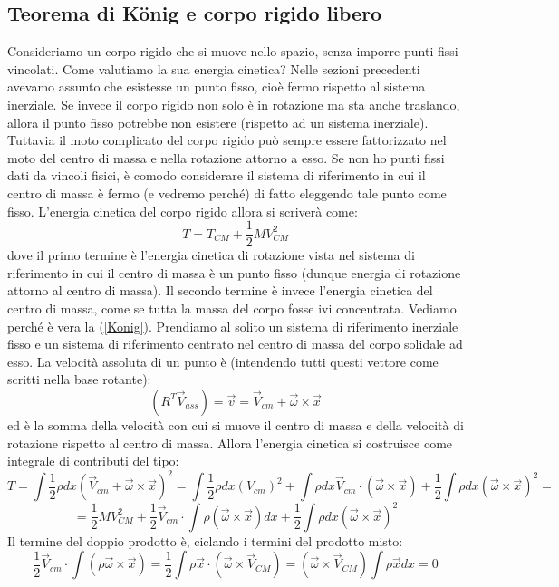 \documentclass[a4paper,openany]{article}
\begin{document}
	\subsection{Teorema di König e corpo rigido libero}
	Consideriamo un corpo rigido che si muove nello spazio, senza imporre punti fissi vincolati. Come valutiamo la sua energia cinetica? Nelle sezioni precedenti avevamo assunto che esistesse un punto fisso, cioè fermo rispetto al sistema inerziale. Se invece il corpo rigido non solo è in rotazione ma sta anche traslando, allora il punto fisso potrebbe non esistere (rispetto ad un sistema inerziale). Tuttavia il moto complicato del corpo rigido può sempre essere fattorizzato nel moto del centro di massa e nella rotazione attorno a esso. Se non ho punti fissi dati da vincoli fisici, è comodo considerare il sistema di riferimento in cui il centro di massa è fermo (e vedremo perché) di fatto eleggendo tale punto come fisso. L'energia cinetica del corpo rigido allora si scriverà come:
	\begin{equation}
		T = T_{CM} + \dfrac{1}{2}MV_{CM}^{2}
		\label{Konig}
	\end{equation}
	dove il primo termine è l'energia cinetica di rotazione vista nel sistema di riferimento in cui il centro di massa è un punto fisso (dunque energia di rotazione attorno al centro di massa). Il secondo termine è invece l'energia cinetica del centro di massa, come se tutta la massa del corpo fosse ivi concentrata. 
	Vediamo perché è vera la (\ref{Konig}). Prendiamo al solito un sistema di riferimento inerziale fisso e un sistema di riferimento centrato nel centro di massa del corpo solidale ad esso. La velocità assoluta di un punto è (intendendo tutti questi vettore come scritti nella base rotante):
	$$
	(R^{T}\vec{V}_{ass}) = \vec{v} = \vec{V}_{cm} + \vec{\omega}\times\vec{x}
	$$
	ed è la somma della velocità con cui si muove il centro di massa e della velocità di rotazione rispetto al centro di massa. Allora l'energia cinetica si costruisce come integrale di contributi del tipo:
	$$
	T = \int \dfrac{1}{2}\rho dx (\vec{V}_{cm} + \vec{\omega}\times\vec{x})^{2} = \int \dfrac{1}{2}\rho dx (V_{cm})^{2} + \int \rho dx \vec{V}_{cm}\cdot(\vec{\omega}\times\vec{x}) + \dfrac{1}{2}\int \rho dx (\vec\omega \times \vec{x})^{2} =
	$$
	$$
	= \dfrac{1}{2}MV_{CM}^{2} + \dfrac{1}{2}\vec{V}_{cm}\cdot\int\rho(\vec\omega \times\vec{x}) dx+ \dfrac{1}{2}\int \rho dx (\vec\omega \times \vec{x})^{2}
	$$
	Il termine del doppio prodotto è, ciclando i termini del prodotto misto:
	$$
	\dfrac{1}{2}\vec{V}_{cm}\cdot\int(\rho\vec\omega \times\vec{x}) = \dfrac{1}{2} \int\rho\vec{x}\cdot(\vec\omega \times \vec{V}_{CM}) = (\vec\omega \times \vec{V}_{CM})\int \rho\vec{x} dx = 0
	$$
\end{document}
